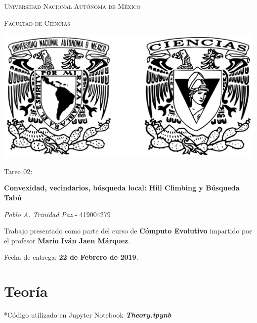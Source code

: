 \documentclass[10pt,letterpaper]{article}
\begin{document}
\begin{titlepage}
    \centering

    {\scshape\LARGE Universidad Nacional Autónoma de México \par}

    \vspace{1cm}
    {\scshape\Large Facultad de Ciencias\par}
    \vspace{1.5cm}

    \begin{center}
        \includegraphics[scale=.1]{../../assets/img/logo.png}
    \end{center}

    \vspace{.8 cm}

    {\LARGE Tarea 02: \par}
    {\huge\bfseries Convexidad, vecindarios, búsqueda local: Hill Climbing y Búsqueda Tabú \par}

    \vspace{0.5cm}
    \large{\itshape{Pablo A. Trinidad Paz}} \small{ - 419004279}

    \vfill

    Trabajo presentado como parte del curso de
    \textbf{Cómputo Evolutivo}
    impartido por el profesor \textbf{Mario Iván Jaen Márquez}. \par
    \vspace{0.5cm}
    Fecha de entrega: \textbf{22 de Febrero de 2019}.
\end{titlepage}

\section{Teoría}
    \small{*Código utilizado en Jupyter Notebook \textbf{\textit{Theory.ipynb}}}
\end{document}
